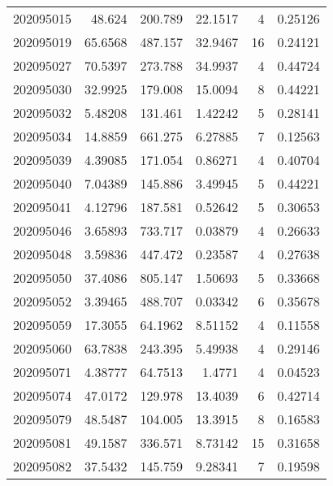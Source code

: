 \begin{tabular}{rrrrrr}
 202095015 &         48.624   &      200.789  &           22.1517  &           4 & 0.25126 \\
 202095019 &         65.6568  &      487.157  &           32.9467  &          16 & 0.24121 \\
 202095027 &         70.5397  &      273.788  &           34.9937  &           4 & 0.44724 \\
 202095030 &         32.9925  &      179.008  &           15.0094  &           8 & 0.44221 \\
 202095032 &          5.48208 &      131.461  &            1.42242 &           5 & 0.28141 \\
 202095034 &         14.8859  &      661.275  &            6.27885 &           7 & 0.12563 \\
 202095039 &          4.39085 &      171.054  &            0.86271 &           4 & 0.40704 \\
 202095040 &          7.04389 &      145.886  &            3.49945 &           5 & 0.44221 \\
 202095041 &          4.12796 &      187.581  &            0.52642 &           5 & 0.30653 \\
 202095046 &          3.65893 &      733.717  &            0.03879 &           4 & 0.26633 \\
 202095048 &          3.59836 &      447.472  &            0.23587 &           4 & 0.27638 \\
 202095050 &         37.4086  &      805.147  &            1.50693 &           5 & 0.33668 \\
 202095052 &          3.39465 &      488.707  &            0.03342 &           6 & 0.35678 \\
 202095059 &         17.3055  &       64.1962 &            8.51152 &           4 & 0.11558 \\
 202095060 &         63.7838  &      243.395  &            5.49938 &           4 & 0.29146 \\
 202095071 &          4.38777 &       64.7513 &            1.4771  &           4 & 0.04523 \\
 202095074 &         47.0172  &      129.978  &           13.4039  &           6 & 0.42714 \\
 202095079 &         48.5487  &      104.005  &           13.3915  &           8 & 0.16583 \\
 202095081 &         49.1587  &      336.571  &            8.73142 &          15 & 0.31658 \\
 202095082 &         37.5432  &      145.759  &            9.28341 &           7 & 0.19598 \\

\end{tabular}
